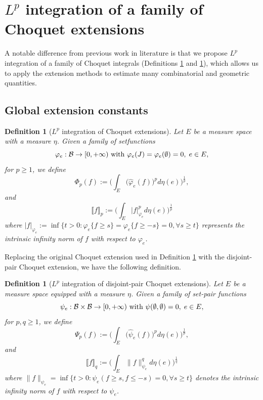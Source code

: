 \documentclass[12pt,a4paper]{article}
\newtheorem{defn}[theorem]{Definition}
\begin{document}
\section{%
$L^p$ integration of a family %
of Choquet extensions 
}
\label{sec:Lp-integration}


A notable difference from previous work in literature %
is that we propose $L^p$ integration of a family of Choquet integrals (Definitions \ref{def:Phi-integration} and \ref{def:Psi-integration}), which allows us to apply the extension methods to estimate many combinatorial and geometric quantities. 

\subsection{Global extension constants}
\begin{defn}[$L^p$ integration of Choquet extensions]\label{def:Phi-integration}
Let $E$ be a measure space with a measure $\eta$. 
Given a family of setfunctions 
$$\varphi_e:\mathcal{B} \to [0,+\infty)\text{ with }\varphi_e(J)=\varphi_e(\emptyset)=0,\; e\in E,$$
for $p\ge 1$, we define $$\Phi_p(f):=\Big(\int_E \big(\widehat{\varphi}_e(f)\big)^pd\eta(e)\Big)^{\frac1p},$$
and 
$$\big\llbracket f \big\rrbracket_p :=\Big(\int_E|f|_{\varphi_e}^pd\eta(e)\Big)^{\frac1p}$$
where $|f|_{\varphi_e}:=\inf \big\{t>0: \varphi_e\{f\ge s\}=\varphi_e\{f\ge -s\}=0,\forall s\ge t\big\}$ represents the intrinsic infinity norm of $f$ with respect to $\varphi_e$.
\end{defn}

Replacing the original Choquet extension used in Definition \ref{def:Phi-integration} with the disjoint-pair Choquet extension, we have the following definition. 
\begin{defn}[$L^p$ integration of disjoint-pair Choquet extensions]\label{def:Psi-integration}
Let $E$ be a measure space equipped with a measure $\eta$. Given a  family of set-pair functions 
$$\psi_e:\mathcal{B}\times \mathcal{B}\to [0,+\infty)\text{ with }\psi(\emptyset,\emptyset)=0,\; e\in E,$$
for $p,q\ge 1$, we define
$$\Psi_p(f):=\Big(\int_E \big(\widehat{\psi}_e(f)\big)^pd\eta(e)\Big)^{\frac1p},$$
and 
$$\big\llbracket f\big\rrbracket_q:=\Big(\int_E\|f\|_{\psi_e}^qd\eta(e)\Big)^{\frac1q}$$
where $\|f\|_{\psi_e}=\inf\{t>0:\psi_e(f\ge s,f\le-s)= 0,\forall s\ge t\}$  denotes  the intrinsic infinity norm of $f$ with respect to $\psi_e$. 
\end{defn}
\end{document}
